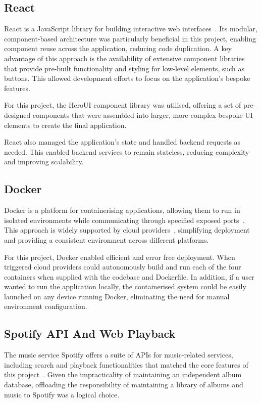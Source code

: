 \subsection{React}
React is a JavaScript library for building interactive web interfaces~\cite{React}. Its modular, component-based architecture was particularly beneficial in this project, enabling component reuse across the application, reducing code duplication. A key advantage of this approach is the availability of extensive component libraries that provide pre-built functionality and styling for low-level elements, such as buttons. This allowed development efforts to focus on the application's bespoke features.

For this project, the HeroUI component library was utilised, offering a set of pre-designed components that were assembled into larger, more complex bespoke UI elements to create the final application.

React also managed the application's state and handled backend requests as needed. This enabled backend services to remain stateless, reducing complexity and improving scalability.

\subsection{Docker}
Docker is a platform for containerising applications, allowing them to run in isolated environments while communicating through specified exposed ports~\cite{DockerDocs}. This approach is widely supported by cloud providers~\cite{AWSDocker,GoogleDocker}, simplifying deployment and providing a consistent environment across different platforms.

For this project, Docker enabled efficient and error free deployment. When triggered cloud providers could autonomously build and run each of the four containers when supplied with the codebase and Dockerfile. In addition, if a user wanted to run the application locally, the containerised system could be easily launched on any device running Docker, eliminating the need for manual environment configuration.

\subsection{Spotify API And Web Playback}
The music service Spotify offers a suite of APIs for music-related services, including search and playback functionalities that matched the core features of this project~\cite{SpotifyAPI}. Given the impracticality of maintaining an independent album database, offloading the responsibility of maintaining a library of albums and music to Spotify was a logical choice.

